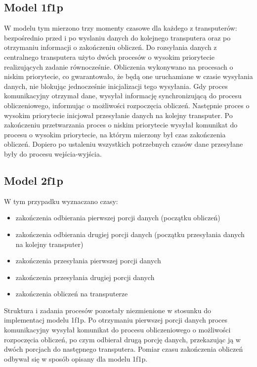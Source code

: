 \documentclass[a4paper,11pt, titlepage]{article}
\begin{document}
\subsection{Model 1f1p}
W modelu tym mierzono trzy momenty czasowe dla każdego z transputerów: bezpośrednio przed i po wyslaniu danych do kolejnego transputera oraz po otrzymaniu informacji o zakończeniu obliczeń. Do rozsyłania danych z centralnego transputera użyto dwóch procesów o wysokim priorytecie realizujących zadanie równocześnie. Obliczenia wykonywano na procesach o niskim priorytecie, co gwarantowało, że będą one uruchamiane w czasie wysyłania danych, nie blokując jednocześnie inicjalizacji tego wysyłania. Gdy proces komunikacyjny otrzymał dane, wysyłał informację synchronizującą do procesu obliczeniowego, informując o możliwości rozpoczęcia obliczeń. Następnie proces o wysokim priorytecie inicjował przesyłanie danych na kolejny transputer. Po zakończeniu przetwarzania proces o niskim priorytecie wysyłał komunikat do procesu o wysokim priorytecie, na którym mierzony był czas zakończenia obliczeń. Dopiero po ustaleniu wszystkich potrzebnych czasów dane przesyłane były do procesu wejścia-wyjścia.
\subsection{Model 2f1p}
W tym  przypadku wyznaczano czasy:
\begin{itemize}
\item zakończenia odbierania pierwszej porcji danych (początku obliczeń)
\item zakończenia odbierania drugiej porcji danych (początku przesyłania danych na kolejny transputer)
\item zakończenia przesyłania pierwszej porcji danych
\item zakończenia przesyłania drugiej porcji danych
\item zakończenia obliczeń na transputerze
\end{itemize}
Struktura i zadania procesów pozostały niezmienione w stosunku do implementacj modelu 1f1p. Po otrzymaniu pierwszej porcji danych proces komunikacyjny wysyłał komunikat do procesu obliczeniowego o możliwości rozpoczęcia obliczeń, po czym odbierał drugą porcję danych, przekazując ją w dwóch porcjach do następnego transputera. Pomiar czasu zakończenia obliczeń odbywał się w sposób opisany dla modelu 1f1p.
\end{document}
